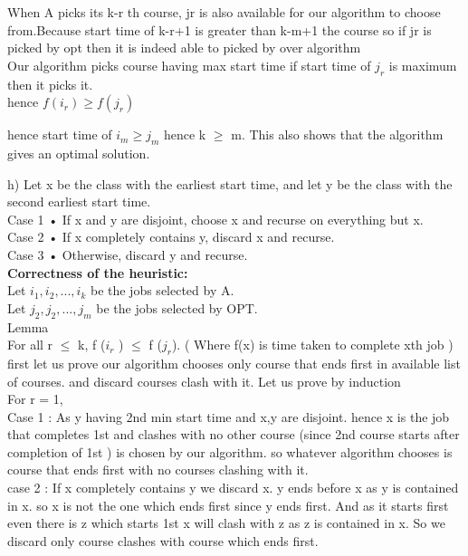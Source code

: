 \documentclass{extarticle}
\theoremstyle{remark}
\begin{document}
When A picks its k-r th course, jr 
is also available for our algorithm to choose from.Because start time of k-r+1 is greater than k-m+1 the course so if jr is picked by opt then it is indeed able to picked by over algorithm \\
Our algorithm picks course having max start time if start time of $j_r$ is maximum then it picks it.\\
hence $f (i_{r}) \geq f (j_{r})$

hence start time of $ i_m \geq j_m $
hence k $\geq$ m.
This also shows that the algorithm  gives an optimal solution.\\

\vspace{0.4 in}


h) Let x be the class with the earliest start time, and let y be the class with
the second earliest start time.\\
 Case 1 • If x and y are disjoint, choose x and recurse on everything but x.\\
 Case 2 • If x completely contains y, discard x and recurse.\\
 Case 3 • Otherwise, discard y and recurse.\\

\textbf{Correctness of the  heuristic:}\\

Let $ i_1, i_{2}, . . . , i_k $ be the jobs selected by A.\\
Let $ j_2, j_{2}, . . . , j_m $ be the jobs selected by OPT.\\
Lemma\\
For all r $\leq$ k, f ($i_r$ ) $\leq$ f ($j_r$).   ( Where f(x) is time taken to complete  xth job )\\

first let us prove our algorithm chooses only course that ends first in available list of courses. and discard courses clash with it.
Let us prove by induction\\
For r = 1,\\ 
Case 1 : As y having 2nd min start time and x,y are disjoint. hence x is the job         that completes 1st and clashes with no other course (since 2nd course starts after completion of 1st ) is chosen by our algorithm. so whatever algorithm chooses is course that ends first with no courses clashing with it.\\
            
            
case 2 : If x completely contains y we discard x.  y ends before x as y is contained in x.  so x is not the one which ends first since y ends first. And as it starts first even there is z which starts 1st x will clash with z as z is contained in x. So we discard only course clashes with course which ends first.
\end{document}
